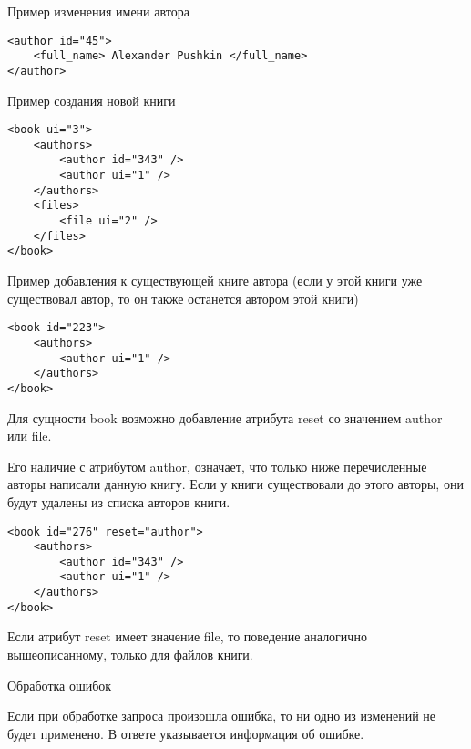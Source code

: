 Пример изменения имени автора 
\begin{verbatim}
<author id="45">
    <full_name> Alexander Pushkin </full_name>
</author>
\end{verbatim}

Пример создания новой книги 
\begin{verbatim}
<book ui="3">
    <authors>
        <author id="343" />
        <author ui="1" />
    </authors>
    <files>
        <file ui="2" />
    </files>
</book>
\end{verbatim}

Пример добавления к существующей книге автора (если у этой книги уже существовал автор, то он также останется автором этой книги) 
\begin{verbatim}
<book id="223">
    <authors>
        <author ui="1" />
    </authors>
</book>
\end{verbatim}

Для сущности book возможно добавление атрибута reset со значением author или file. 

Его наличие с атрибутом author, означает, что только ниже перечисленные авторы написали данную книгу. Если у книги существовали до этого авторы, они будут удалены из списка авторов книги. 
\begin{verbatim}
<book id="276" reset="author">
    <authors>
        <author id="343" />
        <author ui="1" />
    </authors>
</book>
\end{verbatim}

Если атрибут reset имеет значение file, то поведение аналогично вышеописанному, только для файлов книги. 

Обработка ошибок

Если при обработке запроса произошла ошибка, то ни одно из изменений не будет применено. 
В ответе указывается информация об ошибке.

